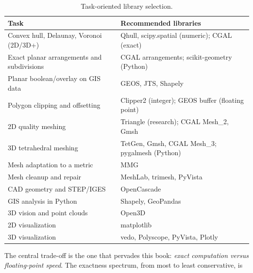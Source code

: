 \begin{table}[ht]
\centering
\begin{tabular}{lp{10cm}}
\hline
\textbf{Task} & \textbf{Recommended libraries} \\
\hline
Convex hull, Delaunay, Voronoi (2D/3D+) & Qhull, scipy.spatial (numeric); CGAL (exact) \\
Exact planar arrangements and subdivisions & CGAL arrangements; scikit-geometry (Python) \\
Planar boolean/overlay on GIS data & GEOS, JTS, Shapely \\
Polygon clipping and offsetting & Clipper2 (integer); GEOS buffer (floating point) \\
2D quality meshing & Triangle (research); CGAL Mesh\_2, Gmsh \\
3D tetrahedral meshing & TetGen, Gmsh, CGAL Mesh\_3; pygalmesh (Python) \\
Mesh adaptation to a metric & MMG \\
Mesh cleanup and repair & MeshLab, trimesh, PyVista \\
CAD geometry and STEP/IGES & OpenCascade \\
GIS analysis in Python & Shapely, GeoPandas \\
3D vision and point clouds & Open3D \\
2D visualization & matplotlib \\
3D visualization & vedo, Polyscope, PyVista, Plotly \\
\hline
\end{tabular}
\caption{Task-oriented library selection.}
\label{tbl:appsoft_choose}
\end{table}

The central trade-off is the one that pervades this book: \emph{exact
computation versus floating-point speed}. The exactness spectrum, from
most to least conservative, is

